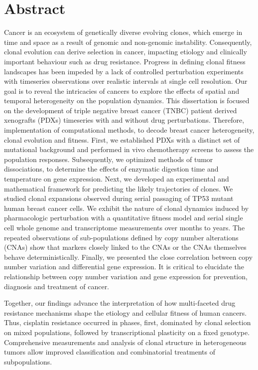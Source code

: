 

\chapter{Abstract}
Cancer is an ecosystem of genetically diverse evolving clones, which emerge in time and space as a result of genomic and non-genomic instability. Consequently, clonal evolution can derive selection in cancer, impacting etiology and clinically important behaviour such as drug resistance. Progress in defining clonal fitness landscapes has been impeded by a lack of controlled perturbation experiments with timeseries observations over realistic intervals at single cell resolution. Our goal is to reveal the intricacies of cancers to explore the effects of spatial and temporal heterogeneity on the population dynamics. This dissertation is focused on the development of triple negative breast cancer (TNBC) patient derived xenografts (PDXs) timeseries with and without drug perturbations. Therefore, implementation of computational methods, to decode breast cancer heterogeneity, clonal evolution and fitness. First, we established PDXs with a distinct set of mutational background and performed in vivo chemotherapy screens to assess the population responses. Subsequently, we optimized methods of tumor dissociations, to determine the effects of enzymatic digestion time and temperature on gene expression. 
Next, we developed an experimental and mathematical framework for predicting the likely trajectories of clones. We studied clonal expansions observed during serial passaging of TP53 mutant human breast cancer cells. We exhibit the nature of clonal dynamics induced by pharmacologic perturbation with a quantitative fitness model and serial single cell whole genome and transcriptome measurements over months to years. The repeated observations of sub-populations defined by copy number alterations (CNAs) show that markers closely linked to the CNAs or the CNAs themselves behave deterministically. Finally, we presented the close correlation between copy number variation and differential gene expression. It is critical to elucidate the relationship between copy number variation and gene expression for prevention, diagnosis and treatment of cancer.

Together, our findings advance the interpretation of how multi-faceted drug resistance mechanisms shape the etiology and cellular fitness of human cancers. Thus, cisplatin resistance occurred in phases, first, dominated by clonal selection on mixed populations, followed by transcriptional plasticity on a fixed genotype. Comprehensive measurements and analysis of clonal structure in heterogeneous tumors allow improved classification and combinatorial treatments of subpopulations.








